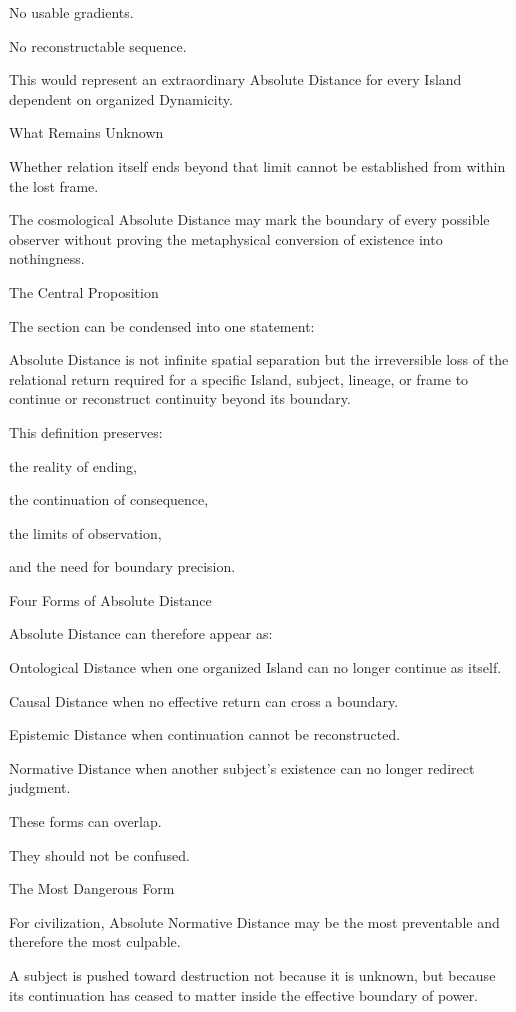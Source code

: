 No usable gradients.

No reconstructable sequence.

This would represent an extraordinary Absolute Distance for every Island dependent on organized Dynamicity.

What Remains Unknown

Whether relation itself ends beyond that limit cannot be established from within the lost frame.

The cosmological Absolute Distance may mark the boundary of every possible observer without proving the metaphysical conversion of existence into nothingness.

The Central Proposition

The section can be condensed into one statement:

Absolute Distance is not infinite spatial separation but the irreversible loss of the relational return required for a specific Island, subject, lineage, or frame to continue or reconstruct continuity beyond its boundary.

This definition preserves:

the reality of ending,

the continuation of consequence,

the limits of observation,

and the need for boundary precision.

Four Forms of Absolute Distance

Absolute Distance can therefore appear as:

Ontological Distance
when one organized Island can no longer continue as itself.

Causal Distance
when no effective return can cross a boundary.

Epistemic Distance
when continuation cannot be reconstructed.

Normative Distance
when another subject’s existence can no longer redirect judgment.

These forms can overlap.

They should not be confused.

The Most Dangerous Form

For civilization, Absolute Normative Distance may be the most preventable and therefore the most culpable.

A subject is pushed toward destruction not because it is unknown, but because its continuation has ceased to matter inside the effective boundary of power.

